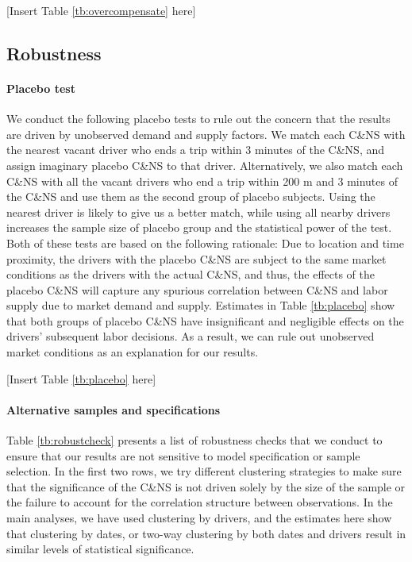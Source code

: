 \documentclass[reviewmode,AEJ]{AEA}
\begin{document}
\begin{center}
	[Insert Table \ref{tb:overcompensate} here]
\end{center}



\subsection{Robustness}

\paragraph{Placebo test}
We conduct the following placebo tests to rule out the concern that the results are driven by unobserved demand and supply factors. We match each C\&NS with the nearest vacant driver who ends a trip within 3 minutes of the C\&NS, and assign imaginary placebo C\&NS to that driver. Alternatively, we also match each C\&NS with all the vacant drivers who end a trip within 200 m and 3 minutes of the C\&NS and use them as the second group of placebo subjects. Using the nearest driver is likely to give us a better match, while using all nearby drivers increases the sample size of placebo group and the statistical power of the test. Both of these tests are based on the following rationale: Due to location and time proximity, the drivers with the placebo C\&NS are subject to the same market conditions as the drivers with the actual C\&NS, and thus, the effects of the placebo C\&NS will capture any spurious correlation between C\&NS and labor supply due to market demand and supply. Estimates in Table \ref{tb:placebo} show that both groups of placebo C\&NS have insignificant and negligible effects on the drivers' subsequent labor decisions. As a result, we can rule out unobserved market conditions as an explanation for our results.

\begin{center}
    [Insert Table \ref{tb:placebo} here]
\end{center}


\paragraph{Alternative samples and specifications} Table \ref{tb:robustcheck} presents a list of robustness checks that we conduct to ensure that our results are not sensitive to model specification or sample selection. In the first two rows, we try different clustering strategies  to make sure that the significance of the C\&NS is not driven solely by the size of the sample or the failure to account for the correlation structure between observations. In the main analyses, we have used clustering by drivers, and the estimates here show that clustering by dates, or two-way clustering by both dates and drivers result in similar levels of statistical significance. 
\end{document}
